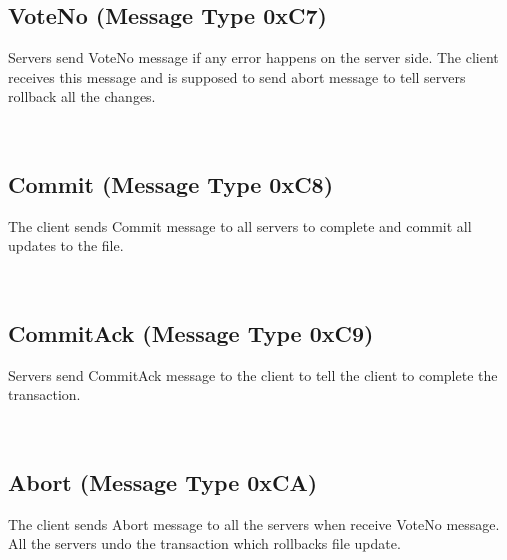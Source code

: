 \documentclass[12pt,fleqn]{article}
\begin{document}
\subsection{VoteNo (Message Type 0xC7)}
Servers send VoteNo message if any error happens on the server side. The client receives this message and is supposed to send abort message to tell servers rollback all the changes.

\begin{center}
	\begin{bytefield}[bitwidth=1.1em]{16}
		 \\
	\end{bytefield}
\end{center}

\subsection{Commit (Message Type 0xC8)}
The client sends Commit message to all servers to complete and commit all updates to the file. 

\begin{center}
	\begin{bytefield}[bitwidth=1.1em]{16}
		 \\
	\end{bytefield}
\end{center}

\subsection{CommitAck (Message Type 0xC9)}
Servers send CommitAck message to the client to tell the client to complete the transaction.

\begin{center}
	\begin{bytefield}[bitwidth=1.1em]{16}
		 \\
	\end{bytefield}
\end{center}

\subsection{Abort (Message Type 0xCA)}
The client sends Abort message to all the servers when receive VoteNo message. All the servers undo the transaction which rollbacks file update.
\end{document}
